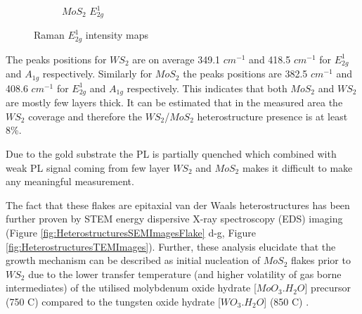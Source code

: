 \begin{figure}[h]
\begin{center}
\begin{subfigure}[b]{0.45\textwidth}
			\caption{$MoS_2$ $E^1_{2g}$}
			\label{fig:HeterostructuresRamanIntensityEMoAu}
		\end{subfigure}
		\caption{Raman $E^1_{2g}$ intensity maps}
		\label{fig:HeterostructuresRamanIntensityEMaps}
	\end{center}
\end{figure}

The peaks positions for $WS_2$ are on average 349.1 $cm^{-1}$ and 418.5 $cm^{-1}$ for $E^1_{2g}$ and $A_{1g}$ respectively. Similarly for $MoS_2$ the peaks positions are 382.5 $cm^{-1}$ and 408.6 $cm^{-1}$ for $E^1_{2g}$ and $A_{1g}$ respectively. This indicates that both $MoS_2$ and $WS_2$ are mostly few layers thick. It can be estimated that in the measured area the $WS_2$ coverage and therefore the $WS_2$/$MoS_2$ heterostructure presence is at least 8{\%}.

Due to the gold substrate the PL is partially quenched which combined with weak PL signal coming from few layer $WS_2$ and $MoS_2$ makes it difficult to make any meaningful measurement.


The fact that these flakes are epitaxial van der Waals heterostructures has been further proven by STEM energy dispersive X-ray spectroscopy (EDS) imaging (Figure \ref{fig:HeterostructuresSEMImagesFlake} d-g, Figure \ref{fig:HeterostructuresTEMImages}). Further, these analysis elucidate that the growth mechanism can be described as initial nucleation of $MoS_2$ flakes prior to $WS_2$ due to the lower transfer temperature (and higher volatility of gas borne intermediates) of the utilised molybdenum oxide hydrate [$MoO_3.H_2O$] precursor (750 {\degree}C) compared to the tungsten oxide hydrate [$WO_3.H_2O$] (850 {\degree}C) \cite{Sahoo2018}\cite{Freedman1959}. 

